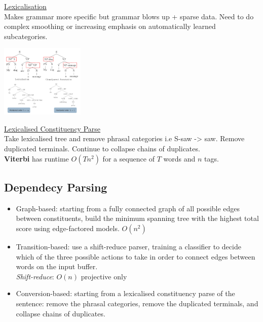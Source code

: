 \documentclass[8pt]{extarticle} %
\begin{document}
\begin{multicols*}{3}
\underline{Lexicalisation}\\
Makes grammar more specific but grammar blows up + sparse data. Need to do complex smoothing or increasing emphasis on automatically learned subcategories. 

\begin{center}
    \includegraphics*[width=0.3\textwidth]{media/markovisation.png}
\end{center}

\underline{Lexicalised Constituency Parse}\\
Take lexicalised tree and remove phrasal categories i.e S-saw -> saw. Remove duplicated terminals. Continue to collapse chains of duplicates.\\
\textbf{Viterbi} has runtime $O(Tn^2)$ for a sequence of $T$ words and $n$ tags. 

\subsection*{Dependecy Parsing}
\begin{itemize}[label=\textbullet, labelsep=0.3em, leftmargin=0.5em, itemsep=0em]
\item Graph-based: starting from a fully connected graph of all possible edges between constituents, build the minimum spanning tree with the highest total score using edge-factored models. $O(n^2)$
\item Transition-based: use a shift-reduce parser, training a classifier to decide which of the three possible actions to take in order to connect edges between words on the input buffer.\\
\textit{Shift-reduce}: $O(n)$ projective only
\item Conversion-based: starting from a lexicalised constituency parse of the sentence: remove the phrasal categories, remove the duplicated terminals, and collapse chains of duplicates.
\end{itemize}


\end{multicols*}
\end{document}
